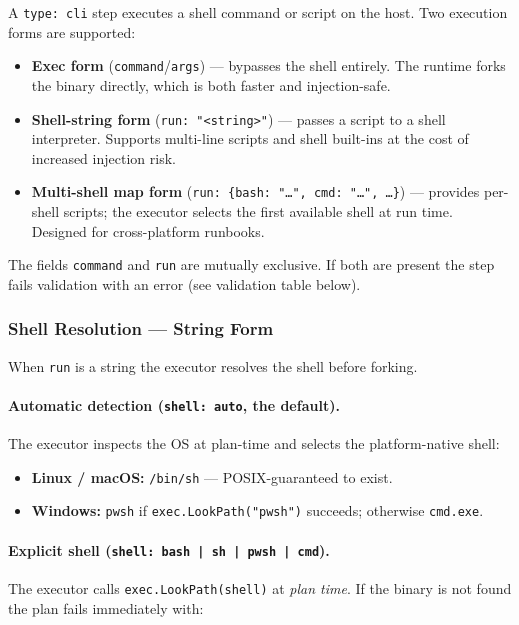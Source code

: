 A \texttt{type: cli} step executes a shell command or script on the host.  Two
execution forms are supported:

\begin{itemize}
  \item \textbf{Exec form} (\texttt{command}/\texttt{args}) — bypasses the shell
        entirely.  The runtime forks the binary directly, which is both faster and
        injection-safe.
  \item \textbf{Shell-string form} (\texttt{run: "<string>"}) — passes a script to a
        shell interpreter.  Supports multi-line scripts and shell built-ins at the cost
        of increased injection risk.
  \item \textbf{Multi-shell map form} (\texttt{run: \{bash: "…", cmd: "…", …\}}) —
        provides per-shell scripts; the executor selects the first available shell at
        run time.  Designed for cross-platform runbooks.
\end{itemize}

The fields \texttt{command} and \texttt{run} are mutually exclusive.  If both are
present the step fails validation with an error (see validation table below).

\subsubsection*{Shell Resolution — String Form}

When \texttt{run} is a string the executor resolves the shell before forking.

\paragraph{Automatic detection (\texttt{shell: auto}, the default).}
The executor inspects the OS at plan-time and selects the platform-native shell:

\begin{itemize}
  \item \textbf{Linux / macOS:} \texttt{/bin/sh} — POSIX-guaranteed to exist.
  \item \textbf{Windows:} \texttt{pwsh} if \texttt{exec.LookPath("pwsh")} succeeds;
        otherwise \texttt{cmd.exe}.
\end{itemize}

\paragraph{Explicit shell (\texttt{shell: bash | sh | pwsh | cmd}).}
The executor calls \texttt{exec.LookPath(shell)} at \emph{plan time}.  If the binary
is not found the plan fails immediately with:

